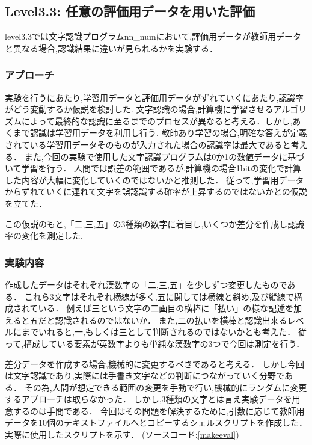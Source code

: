 \subsection{Level3.3: 任意の評価用データを用いた評価}

level3.3では文字認識プログラムnn\_numにおいて,評価用データが教師用データと異なる場合,認識結果に違いが見られるかを実験する．

\subsubsection{アプローチ}
実験を行うにあたり,学習用データと評価用データがずれていくにあたり,認識率がどう変動するか仮説を検討した.
文字認識の場合,計算機に学習させるアルゴリズムによって最終的な認識に至るまでのプロセスが異なると考える．しかし,あくまで認識は学習用データを利用し行う.
教師あり学習の場合,明確な答えが定義されている学習用データそのものが入力された場合の認識率は最大であると考える．
また,今回の実験で使用した文字認識プログラムは0か1の数値データに基づいて学習を行う．
人間では誤差の範囲であるが,計算機の場合1bitの変化で計算した内容が大幅に変化していくのではないかと推測した．
従って,学習用データからずれていくに連れて文字を誤認識する確率が上昇するのではないかとの仮説を立てた．

この仮説のもと,「二,三,五」の3種類の数字に着目し,いくつか差分を作成し認識率の変化を測定した.

\subsubsection{実験内容}
作成したデータはそれぞれ漢数字の「二,三,五」を少しずつ変更したものである．
これら3文字はそれぞれ横線が多く,五に関しては横線と斜め,及び縦線で構成されている．
例えば三という文字の二画目の横棒に「払い」の様な記述を加えると五だと認識されるのではないか．
また,二の払いを横棒と認識出来るレベルにまでいれると,一,もしくは三として判断されるのではないかとも考えた．
従って,構成している要素が英数字よりも単純な漢数字の3つで今回は測定を行う．

差分データを作成する場合,機械的に変更するべきであると考える．
しかし今回は文字認識であり,実際には手書き文字などの判断につながっていく分野である．
その為,人間が想定できる範囲の変更を手動で行い,機械的にランダムに変更するアプローチは取らなかった．
しかし,3種類の文字とは言え実験データを用意するのは手間である．
今回はその問題を解決するために,引数に応じて教師用データを10個のテキストファイルへとコピーするシェルスクリプトを作成した．
実際に使用したスクリプトを示す． (ソースコード:\ref{makeeval})


